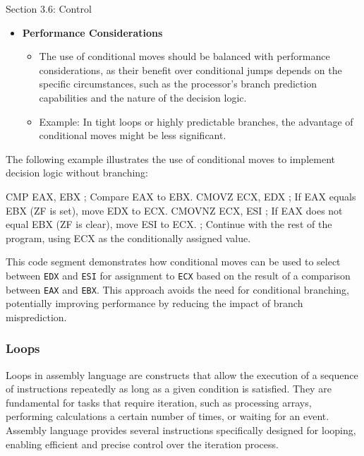 \begin{notes}{Section 3.6: Control}
\begin{itemize}
\begin{itemize}
        \end{itemize}
        \item \textbf{Performance Considerations}
        \begin{itemize}
            \item The use of conditional moves should be balanced with performance considerations, as their benefit over conditional jumps depends on the specific circumstances, such as the processor's 
            branch prediction capabilities and the nature of the decision logic.
            \item Example: In tight loops or highly predictable branches, the advantage of conditional moves might be less significant.
        \end{itemize}
    \end{itemize}
    
    \begin{highlight}
        The following example illustrates the use of conditional moves to implement decision logic without branching:
    
    \begin{code}[Assembly]
    CMP EAX, EBX             ; Compare EAX to EBX.
    CMOVZ ECX, EDX           ; If EAX equals EBX (ZF is set), move EDX to ECX.
    CMOVNZ ECX, ESI          ; If EAX does not equal EBX (ZF is clear), move ESI to ECX.
    ; Continue with the rest of the program, using ECX as the conditionally assigned value.
    \end{code}
    
        This code segment demonstrates how conditional moves can be used to select between \texttt{EDX} and \texttt{ESI} for assignment to \texttt{ECX} based on the result of a comparison between 
        \texttt{EAX} and \texttt{EBX}. This approach avoids the need for conditional branching, potentially improving performance by reducing the impact of branch misprediction.
    \end{highlight}

    \subsubsection*{Loops}

    Loops in assembly language are constructs that allow the execution of a sequence of instructions repeatedly as long as a given condition is satisfied. They are fundamental for tasks that require 
    iteration, such as processing arrays, performing calculations a certain number of times, or waiting for an event. Assembly language provides several instructions specifically designed for looping, 
    enabling efficient and precise control over the iteration process.
    

\end{notes}
